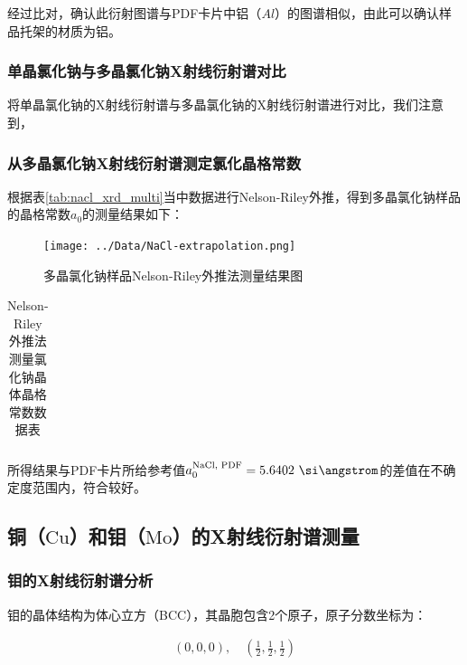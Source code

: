 \documentclass{thuemp}
\begin{document}
经过比对，确认此衍射图谱与PDF卡片中铝（$Al$）的图谱相似，由此可以确认样品托架的材质为铝。

\subsubsection{单晶氯化钠与多晶氯化钠X射线衍射谱对比}

将单晶氯化钠的X射线衍射谱与多晶氯化钠的X射线衍射谱进行对比，我们注意到，

\subsubsection{从多晶氯化钠X射线衍射谱测定氯化晶格常数}

根据表\ref{tab:nacl_xrd_multi}当中数据进行Nelson-Riley外推，得到多晶氯化钠样品的晶格常数$a_0$的测量结果如下：

\begin{figure}[H]
    \centering
    \texttt{[image: ../Data/NaCl-extrapolation.png]}
    \caption{多晶氯化钠样品Nelson-Riley外推法测量结果图}
    \label{fig:nacl_xrd_extrapol}
\end{figure}

\begin{table}[H]
    \centering
    \captionnamefont{\wuhao\bf\heiti}
    \captiontitlefont{\wuhao\bf\heiti}
    \caption{Nelson-Riley外推法测量氯化钠晶体晶格常数数据表}
    \label{tab:nacl_xrd_extrapol}
    \liuhao
    \begin{tabular}{ccccc}
        \toprule
        \midrule
        \bottomrule
    \end{tabular}
\end{table}

所得结果与PDF卡片所给参考值$a_0^{\text{NaCl, PDF}} = 5.6402~\text{\si\angstrom}$的差值在不确定度范围内，符合较好。

\subsection{铜（$\text{Cu}$）和钼（$\text{Mo}$）的X射线衍射谱测量}

\subsubsection{钼的X射线衍射谱分析}

钼的晶体结构为体心立方（BCC），其晶胞包含2个原子，原子分数坐标为：

\begin{align*}
(0,0,0),\quad \left(\frac{1}{2},\frac{1}{2},\frac{1}{2}\right)
\end{align*}
\end{document}
